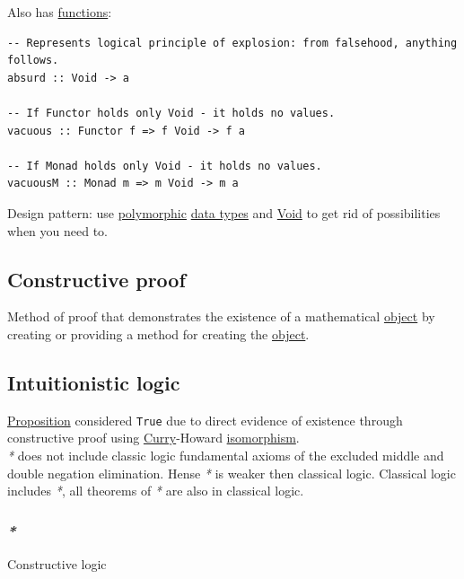 \documentclass[11pt]{article}
\begin{document}
Also has \hyperref[orgaa8fb87]{functions}:\\
\begin{verbatim}
-- Represents logical principle of explosion: from falsehood, anything follows.
absurd :: Void -> a

-- If Functor holds only Void - it holds no values.
vacuous :: Functor f => f Void -> f a

-- If Monad holds only Void - it holds no values.
vacuousM :: Monad m => m Void -> m a
\end{verbatim}

Design pattern: use \hyperref[orgac4d581]{polymorphic} \hyperref[org5c444ae]{data types} and \hyperref[org2fad40d]{Void} to get rid of possibilities when you need to.\\

\subsection{Constructive proof}
\label{sec:org5b2ac9d}

Method of proof that demonstrates the existence of a mathematical \hyperref[org4be0e9d]{object} by creating or providing a method for creating the \hyperref[org4be0e9d]{object}.\\

\subsection{Intuitionistic logic}
\label{sec:org36cb8b3}

\hyperref[org1e068ed]{Proposition} considered \texttt{True} due to direct evidence of existence through constructive proof using \hyperref[orgea8bb21]{Curry}-Howard \hyperref[org91df03a]{isomorphism}.\\

\emph{*} does not include classic logic fundamental axioms of the excluded middle and double negation elimination. Hense \emph{*} is weaker then classical logic. Classical logic includes \emph{*}, all theorems of \emph{*} are also in classical logic.\\

\subsubsection{\emph{*}}
\label{sec:orgbd049d0}

\label{orgf54ffad}Constructive logic\\
\end{document}
